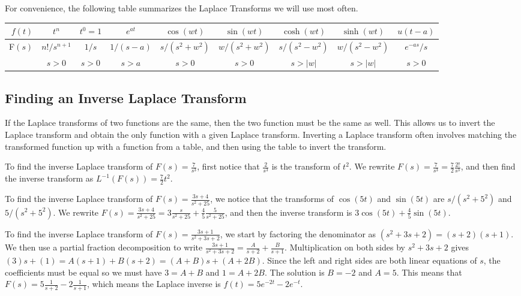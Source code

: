 For convenience, the following table summarizes the Laplace Transforms we will use most often.
\begin{center}
\begin{tabular}{|r|c|c|c|c|c|c|c|c|}
\hline
$f(t)$ & $t^n$        & $t^0=1$        &$e^{at}$   & $\cos(wt)$     &$\sin(wt)$     & $\cosh(wt)$    &$\sinh(wt)$   &$u(t-a)$
\\\hline 
 F$(s)$& $n!/s^{n+1}$  & $1/s$  &$1/(s-a)$  & $s/(s^2+w^2)$  &$w/(s^2+w^2)$  & $s/(s^2-w^2)$  &$w/(s^2-w^2)$ &$e^{-as}/s$
\\
          &$s>0$         &$s>0$         &$s>a$      &$s>0$           &$s>0$          &$s>|w|$         &$s>|w|$       & $s>0$
\\\hline
\end{tabular}
\end{center}


\subsection{Finding an Inverse Laplace Transform}
If the Laplace transforms of two functions are the same, then the two function must be the same as well. This allows us to invert the Laplace transform and obtain the only function with a given Laplace transform.  Inverting a Laplace transform often involves matching the transformed function up with a function from a table, and then using the table to invert the transform.  

To find the inverse Laplace transform of $F(s) = \frac{7}{s^3}$, first notice that $\frac{2}{s^3}$ is the transform of $t^2$. We rewrite $F(s) = \frac{7}{s^3} = \frac{7}{2}\frac{2!}{s^3}$, and then find the inverse transform as $L^{-1}(F(s)) = \frac{7}{2}t^2$.

To find the inverse Laplace transform of $F(s) = \frac{3s+4}{s^2+25}$, we notice that the transforms of $\cos(5t)$ and $\sin(5t)$ are $s/(s^2+5^2)$ and $5/(s^2+5^2)$.  We rewrite $F(s)  = \frac{3s+4}{s^2+25}= 3\frac{s}{s^2+25} +\frac{4}{5} \frac{5}{s^2+25} $, and then the inverse transform is $3\cos(5t)+\frac{4}{5}\sin(5t)$.

To find the inverse Laplace transform of $F(s) = \frac{3s+1}{s^2+3s+2}$, we start by factoring the denominator as $(s^2+3s+2) = (s+2)(s+1)$.  We then use a partial fraction decomposition to write $\frac{3s+1}{s^2+3s+2} = \frac{A}{s+2}+\frac{B}{s+1}$. Multiplication on both sides by $s^2+3s+2$ gives $(3)s+(1) = A(s+1)+B(s+2) = (A+B)s+(A+2B)$.  Since the left and right sides are both linear equations of $s$, the coefficients must be equal so we must have $3=A+B$ and $1=A+2B$. The solution is $B=-2$ and $A=5$.  This means that $F(s) = 5\frac{1}{s+2}-2\frac{1}{s+1}$, which means the Laplace inverse is $f(t) = 5e^{-2t}-2e^{-t}$.

